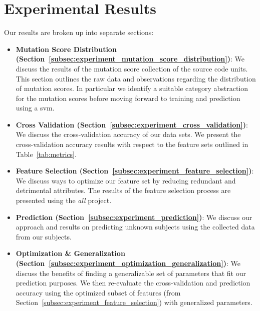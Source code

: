 \section{Experimental Results}
\label{sec:experiment_results}
Our results are broken up into separate sections:

\begin{itemize}
  \item \textbf{Mutation Score Distribution (Section~\ref{subsec:experiment_mutation_score_distribution})}: We discuss the results of the mutation score collection of the source code units. This section outlines the raw data and observations regarding the distribution of mutation scores. In particular we identify a suitable category abstraction for the mutation scores before moving forward to training and prediction using a \gls{svm}.
  \item \textbf{Cross Validation (Section~\ref{subsec:experiment_cross_validation})}: We discuss the cross-validation accuracy of our data sets. We present the cross-validation accuracy results with respect to the feature sets outlined in Table~\ref{tab:metrics}.
  \item \textbf{Feature Selection (Section~\ref{subsec:experiment_feature_selection})}: We discuss ways to optimize our feature set by reducing redundant and detrimental attributes. The results of the feature selection process are presented using the \emph{all} project.
  \item \textbf{Prediction (Section~\ref{subsec:experiment_prediction})}: We discuss our approach and results on predicting unknown subjects using the collected data from our subjects.
  \item \textbf{Optimization \& Generalization (Section~\ref{subsec:experiment_optimization_generalization})}: We discuss the benefits of finding a generalizable set of parameters that fit our prediction purposes. We then re-evaluate the cross-validation and prediction accuracy using the optimized subset of features (from Section~\ref{subsec:experiment_feature_selection}) with generalized parameters.
\end{itemize}


